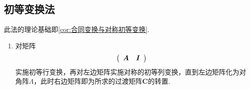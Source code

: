 \subsection{初等变换法}
此法的理论基础即\cref{cor:合同变换与对称初等变换}.
\begin{enumerate}[label=\arabic*）]
    \item 对矩阵\[\left(\begin{array}{c:c}
                      \bm{A} & \bm{I}
                  \end{array}\right)\]
          实施初等行变换，再对左边矩阵实施对称的初等列变换，直到左边矩阵化为对角阵$\bm{\varLambda}$，此时右边矩阵即为所求的过渡矩阵$\bm{C}$的转置.
\end{enumerate}
